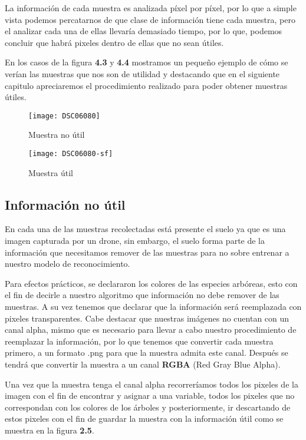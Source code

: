 La información de cada muestra es analizada píxel por píxel, por lo que a simple vista podemos percatarnos de que clase de información tiene cada muestra, pero el analizar cada una de ellas llevaría demasiado tiempo, por lo que, podemos concluir que habrá pixeles dentro de ellas que no sean útiles. 

En los casos de la figura \textbf{4.3} y \textbf{4.4} mostramos un pequeño ejemplo de cómo se verían las muestras que nos son de utilidad y destacando que en el siguiente capitulo apreciaremos el procedimiento realizado para poder obtener muestras útiles.

\begin{figure}[b]
  \centering
  \begin{minipage}[b]{0.4\textwidth}
    \texttt{[image: DSC06080]}
    \caption{Muestra no útil}
  \end{minipage}
  \hfill
  \begin{minipage}[b]{0.4\textwidth}
    \texttt{[image: DSC06080-sf]}
    \caption{Muestra útil}
  \end{minipage}
\end{figure}

\newpage

\subsection{Información no útil}
En cada una de las muestras recolectadas está presente el suelo ya que es una imagen capturada por un drone, sin embargo, el suelo forma parte de la información que necesitamos remover de las muestras para no sobre entrenar a nuestro modelo de reconocimiento.

Para efectos prácticos, se declararon los colores de las especies arbóreas, esto con el fin de decirle a nuestro algoritmo que información no debe remover de las muestras. A su vez tenemos que declarar que la información será reemplazada con pixeles transparentes. Cabe destacar que nuestras imágenes no cuentan con un canal alpha, mismo que es necesario para llevar a cabo nuestro procedimiento de reemplazar la información, por lo que tenemos que convertir cada muestra primero, a un formato .png para que la muestra admita este canal. Después se tendrá que convertir la muestra a un canal \textbf{RGBA} (Red Gray Blue Alpha).

 Una vez que la muestra tenga el canal alpha recorreríamos todos los pixeles de la imagen con el fin de encontrar y asignar a una variable, todos los pixeles que no correspondan con los colores de los árboles y posteriormente, ir descartando de estos pixeles con el fin de guardar la muestra con la información útil como se muestra en la figura \textbf{2.5}.

